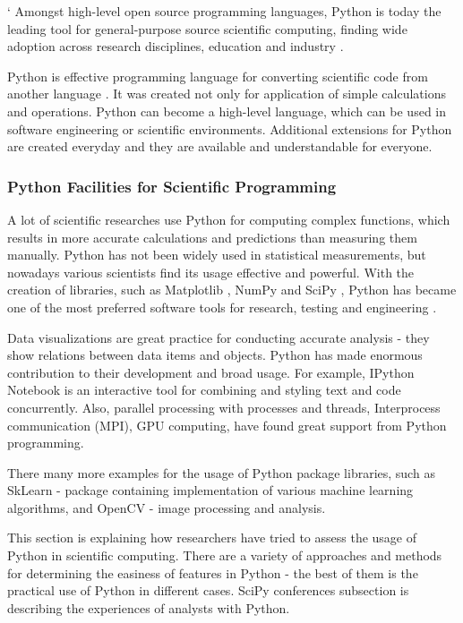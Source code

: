 `
Amongst high-level open source programming languages, Python is today the leading tool for general-purpose source scientific computing, finding wide adoption across research disciplines, education and industry \cite{perez2013open}.

Python is effective programming language for converting scientific code from another language \cite{perez2013open}. It was created not only for application of simple calculations and operations. Python can become a high-level language, which can be used in software engineering or scientific environments. Additional extensions for Python are created everyday and they are available and understandable for everyone.

\subsubsection{Python Facilities for Scientific Programming}

A lot of scientific researches use Python for computing complex functions, which results in more accurate calculations and predictions than measuring them manually. Python has not been widely used in statistical measurements, but nowadays various scientists find its usage effective and powerful. With the creation of libraries, such as Matplotlib \cite{matplotlib}, NumPy \cite{numpy} and SciPy \cite{scipyOff}, Python has became one of the most preferred software tools for research, testing and engineering \cite{perez2007ipython}.

Data visualizations are great practice for conducting accurate analysis - they show relations between data items and objects. Python has made enormous contribution to their development and broad usage. For example, IPython Notebook is an interactive tool for combining and styling text and code concurrently. Also, parallel processing with processes and threads, Interprocess communication (MPI), GPU computing, have found great support from Python programming.

There many more examples for the usage of Python package libraries, such as SkLearn - package containing implementation of various machine learning algorithms, and OpenCV - image processing and analysis. \cite{sklearn}\cite{openCV}

This section is explaining how researchers have tried to assess the usage of Python in scientific computing. There are a variety of approaches and methods for determining the easiness of features in Python - the best of them is the practical use of Python in different cases. SciPy conferences subsection is describing the experiences of analysts with Python. 

